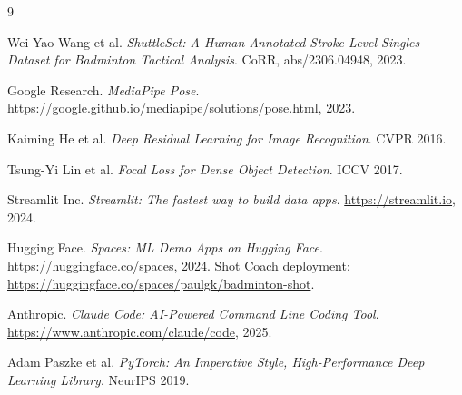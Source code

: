 \documentclass[11pt,a4paper]{article}
\begin{document}
\begin{thebibliography}{9}

Wei-Yao Wang et al. \textit{ShuttleSet: A Human-Annotated Stroke-Level Singles Dataset for Badminton Tactical Analysis}. CoRR, abs/2306.04948, 2023.

Google Research. \textit{MediaPipe Pose}. \url{https://google.github.io/mediapipe/solutions/pose.html}, 2023.

Kaiming He et al. \textit{Deep Residual Learning for Image Recognition}. CVPR 2016.

Tsung-Yi Lin et al. \textit{Focal Loss for Dense Object Detection}. ICCV 2017.

Streamlit Inc. \textit{Streamlit: The fastest way to build data apps}. \url{https://streamlit.io}, 2024.

Hugging Face. \textit{Spaces: ML Demo Apps on Hugging Face}. \url{https://huggingface.co/spaces}, 2024. Shot Coach deployment: \url{https://huggingface.co/spaces/paulgk/badminton-shot}.

Anthropic. \textit{Claude Code: AI-Powered Command Line Coding Tool}. \url{https://www.anthropic.com/claude/code}, 2025.

Adam Paszke et al. \textit{PyTorch: An Imperative Style, High-Performance Deep Learning Library}. NeurIPS 2019.

\end{thebibliography}
\end{document}
